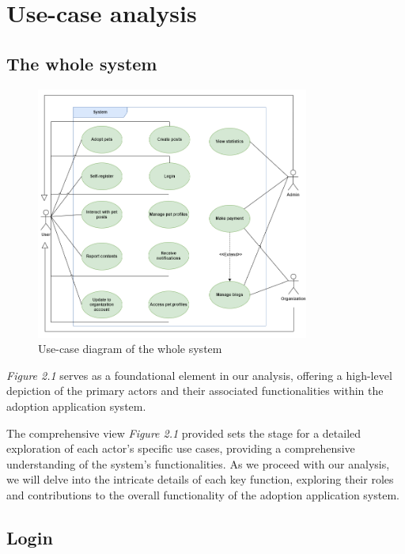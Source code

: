 \section{Use-case analysis}

\subsection{The whole system}

\begin{figure}[H]
  \centering
  \includegraphics[width=0.8\textwidth]{Figures/system_ucd.png}
  \caption{Use-case diagram of the whole system}
  \label{fig:whole-system_activity_diagram}
\end{figure}

\textit{Figure 2.1} serves as a foundational element in our analysis, offering a high-level depiction of the primary actors and their associated functionalities within the adoption application system.

The comprehensive view \textit{Figure 2.1} provided sets the stage for a detailed exploration of each actor's specific use cases, providing a comprehensive understanding of the system's functionalities. As we proceed with our analysis, we will delve into the intricate details of each key function, exploring their roles and contributions to the overall functionality of the adoption application system.

\subsection{Login}

